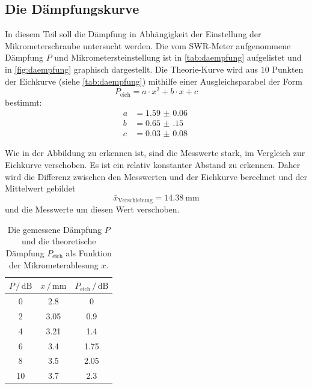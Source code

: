 \subsection{Die Dämpfungskurve}
In diesem Teil soll die Dämpfung in Abhängigkeit der Einstellung der Mikrometerschraube untersucht werden.
Die vom SWR-Meter aufgenommene Dämpfung $P$ und Mikrometersteinstellung ist in \autoref{tab:daempfung} aufgelistet und in \autoref{fig:daempfung} graphisch dargestellt.
Die Theorie-Kurve wird aus $10$ Punkten der Eichkurve (siehe \autoref{tab:daempfung}) mithilfe einer Ausgleichsparabel der Form
\begin{equation*}
    P_\text{eich} = a \cdot x^2 + b \cdot x + c 
\end{equation*}
bestimmt:
\begin{align*}
    a &= \SI{1.59(6)}{} \\
    b &= \SI{0.65(15)}{} \\
    c &= \SI{0.03(8)}{}
\end{align*}

Wie in der Abbildung zu erkennen ist, sind die Messwerte stark, im Vergleich zur Eichkurve verschoben.
Es ist ein relativ konstanter Abstand zu erkennen.
Daher wird die Differenz zwischen den Messwerten und der Eichkurve berechnet und der Mittelwert gebildet
\begin{equation}
    \bar{x}_\text{Verschiebung} = \SI{14.38}{\milli\metre}
\end{equation}
und die Messwerte um diesen Wert verschoben.
\begin{table}
    \centering
    \caption{Die gemessene Dämpfung $P$ und die theoretische Dämpfung $P_\text{eich}$ als Funktion der Mikrometerablesung $x$.}
    \label{tab:daempfung}
    \begin{tabular}{S[table-format=1] S[table-format=1.2] S[table-format=1.2]}
        \toprule
        $P \,/\, \si{\dB}$ & $x \,/\, \si{\milli\metre}$ & $P_\text{eich} \,/\, \si{\dB}$\\
         & 2.8 & 0 \\
        2 & 3.05 & 0.9 \\
        4 & 3.21 & 1.4 \\
        6 & 3.4 & 1.75 \\
        8 & 3.5 & 2.05 \\
        10 & 3.7 & 2.3 \\
        \bottomrule
    \end{tabular}
\end{table}

